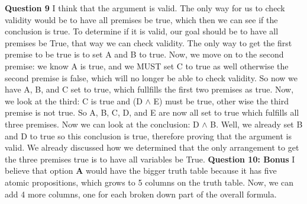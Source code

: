 \documentclass{article}
\begin{document}
\textbf{Question 9} \newline
I think that the argument is valid. The only way for us to check validity would be to have all premises be true, which then we can see if the conclusion is true. To determine if it is valid, our goal should be to have all premises be True, that way we can check validity. The only way to get the first premise to be true is to set A and B to true. Now, we move on to the second premise: we know A is true, and we MUST set C to true as well otherwise the second premise is false, which will no longer be able to check validity. So now we have A, B, and C set to true, which fullfills the first two premises as true. Now, we look at the third: C is true and (D $\wedge$ E) must be true, other wise the third premise is not true. So A, B, C, D, and E are now all set to true which fulfills all three premises. Now we can look at the conclusion: D $\wedge$ B. Well, we already set B and D to true so this conclusion is true, therefore proving that the argument is valid. We already discussed how we determined that the only arrangement to get the three premises true is to have all variables be True. \newline\newline
\textbf{Question 10: Bonus}\newline
I believe that option \textbf{A} would have the bigger truth table because it has five atomic propositions, which grows to 5 columns on the truth table. Now, we can add 4 more columns, one for each broken down part of the overall formula.
\end{document}

